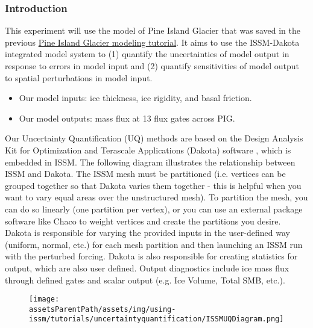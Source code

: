 \subsubsection{Introduction}%
This experiment will use the model of Pine Island Glacier that was saved in the previous 
\hyperref[sec:using-issm-tutorials-pig]{Pine Island Glacier modeling tutorial}.
It aims to use the ISSM-Dakota integrated model system to (1) quantify the uncertainties of model output in response to errors in model input and (2) quantify sensitivities of model output to spatial perturbations in model input.
\begin{itemize}
	\item Our model inputs: ice thickness, ice rigidity, and basal friction.
	\item Our model outputs: mass flux at 13 flux gates across PIG.
\end{itemize}
Our Uncertainty Quantification (UQ) methods are based on the Design Analysis Kit for Optimization and Terascale Applications (Dakota) software \citep{Eldred2008}, which is embedded in ISSM. The following diagram illustrates the relationship between ISSM and Dakota. The ISSM mesh must be partitioned (i.e. vertices can be grouped together so that Dakota varies them together - this is helpful when you want to vary equal areas over the unstructured mesh). To partition the mesh, you can do so linearly (one partition per vertex), or you can use an external package software like Chaco to weight vertices and create the partitions you desire. Dakota is responsible for varying the provided inputs in the user-defined way (uniform, normal, etc.) for each mesh partition and then launching an ISSM run with the perturbed forcing. Dakota is also responsible for creating statistics for output, which are also user defined. Output diagnostics include ice mass flux through defined gates and scalar output (e.g. Ice Volume, Total SMB, etc.).
\begin{figure}[H]
	\begin{center}
		\texttt{[image: \\assetsParentPath/assets/img/using-issm/tutorials/uncertaintyquantification/ISSMUQDiagram.png]}
	\end{center}
\end{figure}

